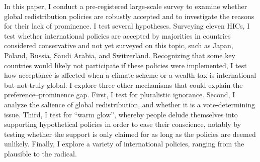 \documentclass[12pt,english]{article}
\begin{document}
\begin{bibunit}

In this paper, I conduct a pre-registered large-scale survey to examine whether global redistribution policies are robustly accepted and to investigate the reasons for their lack of prominence. I test several hypotheses. Surveying eleven HICs, I test whether international policies are accepted by majorities in countries considered conservative and not yet surveyed on this topic, such as Japan, Poland, Russia, Saudi Arabia, and Switzerland. Recognizing that some key countries would likely not participate if these policies were implemented, I test how acceptance is affected when a climate scheme or a wealth tax is international but not truly global. I explore three other %
mechanisms that could explain the  preference--prominence gap. 
First, I test for pluralistic ignorance. Second, I analyze the salience of global redistribution, and whether it is a vote-determining issue. Third, I test for ``warm glow'', whereby people delude themselves into supporting hypothetical policies in order to ease their conscience, notably by testing whether the support is only claimed for as long as the policies are deemed unlikely. Finally, I explore a variety of international policies, ranging from the plausible to the radical. %


\end{bibunit}
\end{document}
